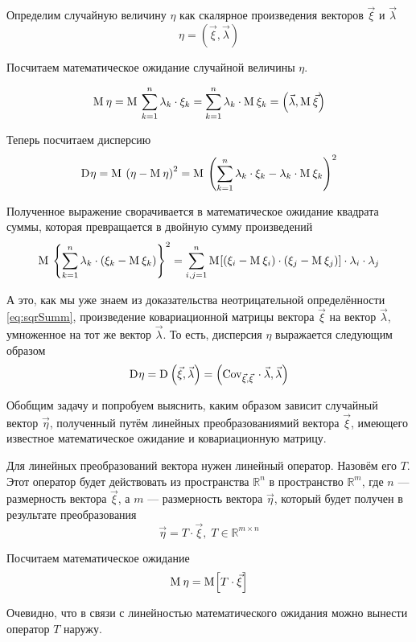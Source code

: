Определим случайную величину $\eta$ как скалярное произведения векторов
$\vec{\xi}$ и $\vec{\lambda}$
$$\eta = \left( \vec{\xi}, \vec{\lambda} \right)$$

Посчитаем математическое ожидание случайной величины $\eta$.

$$\mathrm{M}_{}\,\eta
    = \mathrm{M}_{}\,\sum_{k=1}^{n} \lambda_k \cdot \xi_k
    = \sum_{k=1}^{n} \lambda_k \cdot \mathrm{M}_{}\,\xi_k
    = \left( \vec{\lambda}, \mathrm{M}_{}\,\vec{\xi} \right)$$

Теперь посчитаем дисперсию
$$\mathrm{D}_{} \eta
    = \mathrm{M}_{}\,\left( \eta - \mathrm{M}_{}\,\eta \right)^2
    = \mathrm{M}_{}\,\left( \sum_{k=1}^{n} \lambda_k \cdot \xi_k
        - \lambda_k \cdot \mathrm{M}_{}\,\xi_k \right)^2$$

Полученное выражение сворачивается в математическое ожидание квадрата суммы,
которая превращается в двойную сумму произведений
$$\mathrm{M}_{}\,\left\{ \sum_{k=1}^{n} \lambda_k
    \cdot \left( \xi_k - \mathrm{M}_{}\,\xi_k \right) \right\}^2
    = \sum_{i,j=1}^{n}\mathrm{M}_{}\!\left[ \left( \xi_i - \mathrm{M}_{}\,\xi_i \right)
            \cdot \left( \xi_j - \mathrm{M}_{}\,\xi_j \right) \right]
        \cdot \lambda_i \cdot \lambda_j$$

А это, как мы уже знаем из доказательства неотрицательной определённости
\eqref{eq:sqrSumm}, произведение ковариационной матрицы вектора $\vec{\xi}$
на вектор $\vec{\lambda}$, умноженное на тот же вектор $\vec{\lambda}$.
То есть, дисперсия $\eta$ выражается следующим образом
\begin{equation}\label{eq:linearQuadraticForm}
\mathrm{D}_{} \eta
    = \mathrm{D}_{} \left( \vec{\xi}, \vec{\lambda} \right)
    = \left( \mathrm{Cov}_{\vec{\xi}, \vec{\xi}}\, \cdot \vec{\lambda}, \vec{\lambda} \right)
\end{equation}

Обобщим задачу и попробуем выяснить, каким образом зависит случайный вектор
$\vec{\eta}$, полученный путём линейных преобразованиямий вектора $\vec{\xi}$,
имеющего известное математическое ожидание и ковариационную матрицу.

Для линейных преобразований вектора нужен линейный оператор. Назовём его $T$.
Этот оператор будет действовать из пространства $\mathbb{R}^n$
в пространство $\mathbb{R}^m$, где $n$ --- размерность вектора $\vec{\xi}$,
а $m$ --- размерность вектора $\vec{\eta}$, который будет получен
в результате преобразования
$$\vec{\eta} = T \cdot \vec{\xi},\; T \in \mathbb{R}^{m \times n}$$

Посчитаем математическое ожидание
$$\mathrm{M}_{}\,\eta = \mathrm{M}_{}\!\left[ T \cdot \vec{\xi} \right]$$

Очевидно, что в связи с линейностью математического ожидания можно вынести
оператор $T$ наружу.

